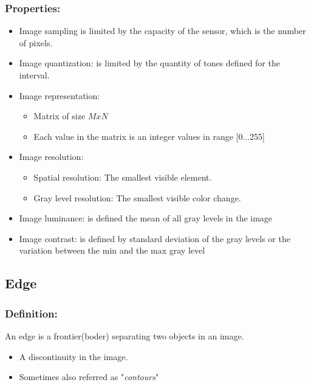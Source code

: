 \subsubsection{Properties:}
\begin{itemize}
\item Image sampling is limited by the capacity of the sensor, which is the number of pixels.
\item Image quantization: is limited by the quantity of tones defined for the interval.
\item Image representation: 
\begin{itemize}
\item Matrix of size $MxN$
\item Each value in the matrix is an integer values in range [0...255]
\end{itemize}
\item Image resolution:
\begin{itemize}
\item Spatial resolution: The smallest visible element.
\item Gray level resolution: The smallest visible color change.
\end{itemize}
\item Image luminance: is defined the mean of all gray levels in the image
\item Image contrast: is defined by standard deviation of the gray levels or the variation between the min and the max gray level
\end{itemize}
\subsection{Edge}
\subsubsection{Definition:}
An edge is a frontier(boder) separating two objects in an image.
\begin{itemize}
\item A discontinuity in the image.
\item Sometimes also referred as "\textit{contours}"
\end{itemize}
